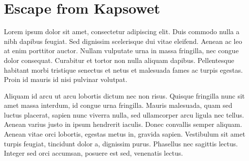 \chapter{Escape from Kapsowet}

Lorem ipsum dolor sit amet, consectetur adipiscing elit. Duis commodo nulla a nibh dapibus feugiat. Sed dignissim scelerisque dui vitae eleifend. Aenean ac leo at enim porttitor auctor. Nullam vulputate urna in massa fringilla, nec congue dolor consequat. Curabitur et tortor non nulla aliquam dapibus. Pellentesque habitant morbi tristique senectus et netus et malesuada fames ac turpis egestas. Proin id mauris id nisi pulvinar volutpat.

Aliquam id arcu ut arcu lobortis dictum nec non risus. Quisque fringilla nunc sit amet massa interdum, id congue urna fringilla. Mauris malesuada, quam sed luctus placerat, sapien nunc viverra nulla, sed ullamcorper arcu ligula nec tellus. Aenean varius justo in ipsum hendrerit iaculis. Donec convallis semper aliquam. Aenean vitae orci lobortis, egestas metus in, gravida sapien. Vestibulum sit amet turpis feugiat, tincidunt dolor a, dignissim purus. Phasellus nec sagittis lectus. Integer sed orci accumsan, posuere est sed, venenatis lectus.

